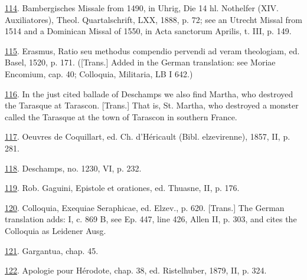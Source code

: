 \protect\hypertarget{23_NOTES.xhtmlux5cux23id_1046}{\protect\hyperlink{13_Chapter_Six__THE_DEPICTION_OF_TH.xhtmlux5cux23id_1045}{114}}.
Bambergisches Missale from 1490, in Uhrig, Die 14 hl. Nothelfer (XIV.
Auxiliatores), Theol. Quartalschrift, LXX, 1888, p. 72; see an Utrecht
Missal from 1514 and a Dominican Missal of 1550, in Acta sanctorum
Aprilis, t. III, p. 149.

\protect\hypertarget{23_NOTES.xhtmlux5cux23id_1044}{\protect\hyperlink{13_Chapter_Six__THE_DEPICTION_OF_TH.xhtmlux5cux23id_1043}{115}}.
Erasmus, Ratio seu methodus compendio pervendi ad veram theologiam, ed.
Basel, 1520, p. 171. ({[}Trans.{]} Added in the German translation: see
Moriae Encomium, cap. 40; Colloquia, Militaria, LB I 642.)

\protect\hypertarget{23_NOTES.xhtmlux5cux23id_1042}{\protect\hyperlink{13_Chapter_Six__THE_DEPICTION_OF_TH.xhtmlux5cux23id_1041}{116}}.
In the just cited ballade of Deschamps we also find Martha, who
destroyed the Tarasque at Tarascon. {[}Trans.{]} That is, St. Martha,
who destroyed a monster called the Tarasque at the town of Tarascon in
southern France.

\protect\hypertarget{23_NOTES.xhtmlux5cux23id_1040}{\protect\hyperlink{13_Chapter_Six__THE_DEPICTION_OF_TH.xhtmlux5cux23id_1039}{117}}.
Oeuvres de Coquillart, ed. Ch. d'Héricault (Bibl. elzevirenne), 1857,
II, p. 281.

\protect\hypertarget{23_NOTES.xhtmlux5cux23id_1038}{\protect\hyperlink{13_Chapter_Six__THE_DEPICTION_OF_TH.xhtmlux5cux23id_1037}{118}}.
Deschamps, no. 1230, VI, p. 232.

\protect\hypertarget{23_NOTES.xhtmlux5cux23id_1036}{\protect\hyperlink{13_Chapter_Six__THE_DEPICTION_OF_TH.xhtmlux5cux23id_1035}{119}}.
Rob. Gaguini, Epistole et orationes, ed. Thuasne, II, p. 176.

\protect\hypertarget{23_NOTES.xhtmlux5cux23id_1034}{\protect\hyperlink{13_Chapter_Six__THE_DEPICTION_OF_TH.xhtmlux5cux23id_1033}{120}}.
Colloquia, Exequiae Seraphicae, ed. Elzev., p. 620. {[}Trans.{]} The
German translation adds: I, c. 869 B, see Ep. 447, line 426, Allen II,
p. 303, and cites the Colloquia as Leidener Ausg.

\protect\hypertarget{23_NOTES.xhtmlux5cux23id_1032}{\protect\hyperlink{13_Chapter_Six__THE_DEPICTION_OF_TH.xhtmlux5cux23id_1031}{121}}.
Gargantua, chap. 45.

\protect\hypertarget{23_NOTES.xhtmlux5cux23id_1030}{\protect\hyperlink{13_Chapter_Six__THE_DEPICTION_OF_TH.xhtmlux5cux23id_1029}{122}}.
Apologie pour Hérodote, chap. 38, ed. Ristelhuber, 1879, II, p. 324.

